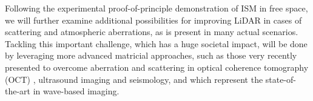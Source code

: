\documentclass{article}
\begin{document}
Following the experimental proof-of-principle demonstration of ISM in free space, we will further examine additional possibilities for improving LiDAR in cases of scattering and atmospheric aberrations, as is present in many actual scenarios. Tackling this important challenge, which has a huge societal impact, will be done by leveraging more advanced matricial approaches, such as those very recently presented to overcome aberration and scattering in optical coherence tomography (OCT) \cite{Badon2020}, ultrasound  imaging \cite{PhysRevX.10.021048} and seismology\cite{2018JB016361}, and which represent the state-of-the-art in wave-based imaging.%

\end{document}
